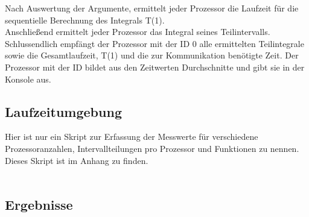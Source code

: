 \documentclass[a4paper,12pt]{scrartcl}
\begin{document}
Nach Auswertung der Argumente, ermittelt jeder Prozessor die Laufzeit f\"ur die sequentielle Berechnung des Integrals T(1).\\
Anschlie\ss{}end ermittelt jeder Prozessor das Integral seines Teilintervalls.
Schlussendlich empf\"angt der Prozessor mit der ID 0 alle ermittelten Teilintegrale sowie die Gesamtlaufzeit, T(1) und die zur
Kommunikation ben\"otigte Zeit.
Der Prozessor mit der ID bildet aus den Zeitwerten Durchschnitte und gibt sie in der Konsole aus.


\subsection{Laufzeitumgebung}
Hier ist nur ein Skript zur Erfassung der Messwerte f\"ur verschiedene Prozessoranzahlen, Intervallteilungen pro Prozessor und Funktionen zu nennen.\\
Dieses Skript ist im Anhang  zu finden.\\\\


\subsection{Ergebnisse}
\end{document}
